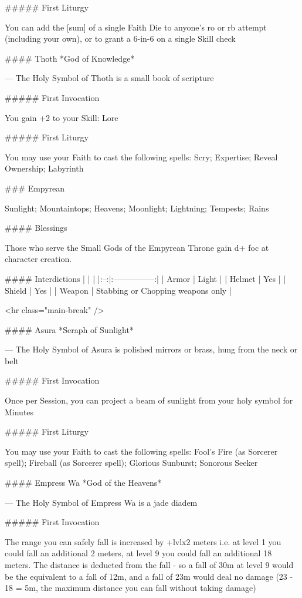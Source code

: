 ##### First Liturgy

You can add the [sum] of a single Faith Die to anyone's {ro} or {rb} attempt (including your own), or to grant a 6-in-6 on a single Skill check





#### Thoth
*God of Knowledge*

---
The Holy Symbol of Thoth is a small book of scripture

##### First Invocation

You gain +2 to your Skill: Lore

##### First Liturgy

You may use your Faith to cast the following spells: Scry; Expertise; Reveal Ownership; Labyrinth



### Empyrean



Sunlight; Mountaintops; Heavens; Moonlight; Lightning; Tempests; Rains



#### Blessings

Those who serve the Small Gods of the Empyrean Throne gain {d+} {foc} at character creation.

#### Interdictions
| | |
|:--:|:---------------:|
| Armor | Light |
| Helmet | Yes |
| Shield | Yes |
| Weapon | Stabbing or Chopping weapons only |

<hr class="main-break" />

#### Asura
*Seraph of Sunlight*

---
The Holy Symbol of Asura is polished mirrors or brass, hung from the neck or belt

##### First Invocation

Once per Session, you can project a beam of sunlight from your holy symbol for Minutes

##### First Liturgy

You may use your Faith to cast the following spells: Fool's Fire (as Sorcerer spell); Fireball (as Sorcerer spell); Glorious Sunburst; Sonorous Seeker






#### Empress Wa
*God of the Heavens*

---
The Holy Symbol of Empress Wa is a jade diadem

##### First Invocation

The range you can safely fall is increased by +{lvl}x2 meters i.e. at level 1 you could fall an additional 2 meters, at level 9 you could fall an additional 18 meters.  The distance is deducted from the fall - so a fall of 30m at level 9 would be the equivalent to a fall of 12m, and a fall of 23m would deal no damage (23 - 18 = 5m, the maximum distance you can fall without taking damage)

